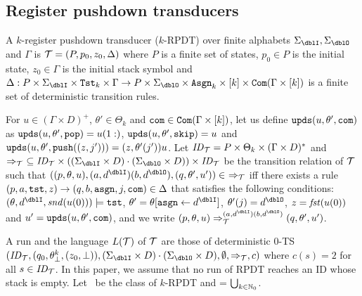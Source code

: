 \subsection{Register pushdown transducers}
\begin{definition}
A $k$-{register pushdown transducer} ($k$-RPDT) over finite alphabets $\Sigma_\dblI,\Sigma_\dblO$ and $\Gamma$ is
${\cal T}=(P, p_0, z_0, \Delta)$ where
$P$ is a finite set of states,
$p_0\in P$ is the initial state,
$z_0\in \Gamma$ is the initial stack symbol and
$\Delta: P\times\Sigma_\dblI\times\Tst_k\times\Gamma \to P\times\Sigma_\dblO\times \Asgn_k \times [k]\times \Com(\Gamma\times[k])$ is a finite set of deterministic transition rules.
\end{definition}
For $u\in (\Gamma\times D)^+$, $\theta'\in\Theta_k$ and $\mathtt{com}\in\mathtt{Com}(\Gamma\times[k])$, let us define $\mathtt{upds}(u,\theta',\mathtt{com})$ as $\mathtt{upds}(u,\theta',\mathtt{pop})=u(1:)$, $\mathtt{upds}(u,\theta',\mathtt{skip})=u$ and $\mathtt{upds}(u,\theta',\mathtt{push}((z,j')))=(z,\theta'(j'))u$.
Let $\mathit{ID}_{\cal T}= P\times \Theta_k\times (\Gamma\times D)^*$
and $\Rightarrow_\calT\ \subseteq \ID_\calT\times ((\Sigma_\dblI\times D)\cdot(\Sigma_\dblO\times D))\times \ID_\calT$ be the transition relation of ${\cal T}$ such that $((p, \theta, u), (a,d^\dblI)(b,d^\dblO), (q, \theta', u'))\in\ \Rightarrow_\calT$ iff
there exists a rule $(p, a, \mathtt{tst}, z) \to (q, b, \mathtt{asgn}, j, \mathtt{com}) \in \Delta$
that satisfies the following conditions:
$(\theta, d^\dblI, \scnd(u(0)))\models\tst$, $\theta' = \theta[\asgn\leftarrow d^\dblI]$, $\theta'(j) = d^\dblO$,
$z=\mathit{fst}(u(0))$ and
$u'=\mathtt{upds}(u,\theta',\mathtt{com})$,
and we write $(p, \theta, u) \done_{\calT}^{(a,d^\dblI)(b,d^\dblO)}(q, \theta', u')$.

A run and the language $L({\cal T})$ of ${\cal T}$ are those of deterministic $0$-TS $(\ID_\calT, (q_0,\theta^k_\bot, (z_0,\bot)), (\Sigma_\dblI\times D)\cdot(\Sigma_\dblO\times D), \emptyset, \Rightarrow_\calT, c)$ where $c(s)=2$ for all $s\in\mathit{ID}_{\cal T}$.
In this paper,
we assume that no run of RPDT reaches an ID whose stack is empty.
Let \RPDTk\ be the class of $k$-RPDT and \RPDT = $\bigcup_{k\in\mathbb{N}_0}$\RPDTk.

